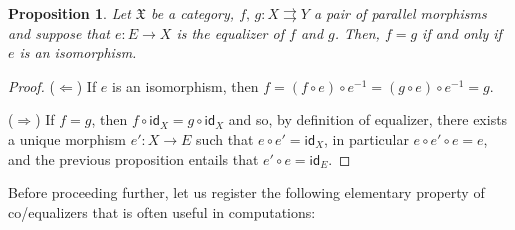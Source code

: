 \documentclass[12pt]{article}
\newtheorem{proposition}[lemma]{Proposition}
\theoremstyle{definition}
\def\X{\mathfrak X}
\numberwithin{equation}{section}
\newcommand{\id}[1]{\mathsf{id}_{#1}}
\begin{document}

\begin{proposition}\label{equalizer_of_equals}
Let $\X$ be a category, $f,\, g\colon X\rightrightarrows Y$ a pair of parallel morphisms and suppose that $e\colon E\to X$ is the equalizer of $f$ and $g$. Then, $f=g$ if and only if $e$ is an isomorphism. 
\end{proposition} 
\begin{proof}
 ($\Leftarrow$) If $e$ is an isomorphism, then  $f=(f\circ e)\circ e^{-1}=(g\circ e)\circ e^{-1}=g$.
	
	\noindent($\Rightarrow$) If $f=g$, then $f\circ \id X=g\circ \id X$ and so, by definition of equalizer, there exists a unique morphism $e'\colon X\to E$ such that $e\circ e'=\id X$, in particular $e\circ e'\circ e=e$, and the previous proposition entails that  $e'\circ e=\id E$.
\end{proof}

Before proceeding further, let us register the following elementary property of co/equalizers that is often useful in computations:
\end{document}
